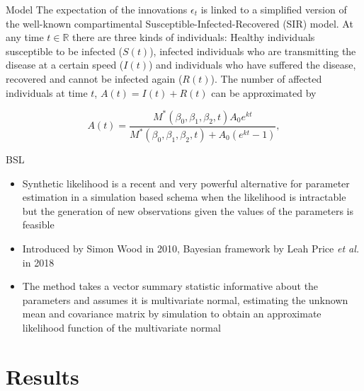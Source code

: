 \documentclass[aspectratio=169,usepdftitle=true]{beamer}
\begin{document}
\begin{frame}{Model}
The expectation of the innovations $\epsilon_t$ is linked to a simplified version of the well-known compartimental Susceptible-Infected-Recovered (SIR) model. At any time $t \in \mathbb{R}$ there are three kinds of individuals: Healthy individuals susceptible to be infected ($S(t)$), infected individuals who are transmitting the disease at a certain speed ($I(t)$) and individuals who have suffered the disease, recovered and cannot be infected again ($R(t)$). The number of affected individuals at time $t$, $A(t) = I(t) + R(t)$ can be approximated by

\begin{equation}\label{eq:SIR}
    A(t) = \frac{M^{*}(\beta_0, \beta_1, \beta_2, t) A_0 e^{kt}}{M^{*}(\beta_0, \beta_1, \beta_2, t)+A_0(e^{kt}-1)},
\end{equation}
\end{frame}

\begin{frame}{BSL}
\begin{itemize}
 \item Synthetic likelihood is a recent and very powerful alternative for parameter estimation in a simulation based schema when the likelihood is intractable but the generation of new observations given the values of the parameters is feasible
 \item Introduced by Simon Wood in 2010, Bayesian framework by Leah Price \textit{et al.} in 2018
 \item The method takes a vector summary statistic informative about the parameters and assumes it is multivariate normal, estimating the unknown mean and covariance matrix by simulation to obtain an approximate likelihood function of the multivariate normal
\end{itemize}
\end{frame}

\section{Results}
\end{document}

